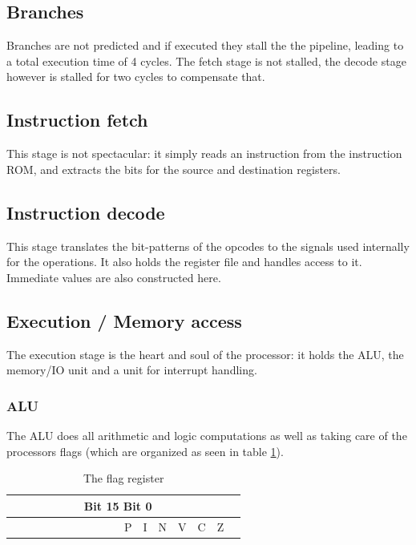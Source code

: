 \documentclass[10pt, twoside, a4paper]{article}
\begin{document}
  \subsection{Branches}
  Branches are not predicted and if executed they stall the the
  pipeline, leading to a total execution time of 4 cycles. The fetch
  stage is not stalled, the decode stage however is stalled for two
  cycles to compensate that.

  \subsection{Instruction fetch}
  This stage is not spectacular: it simply reads an instruction from
  the instruction ROM, and extracts the bits for the source and
  destination registers.

  \subsection{Instruction decode}
  This stage translates the bit-patterns of the opcodes to the signals
  used internally for the operations. It also holds the register file
  and handles access to it. Immediate values are also constructed here.

  \subsection{Execution / Memory access}
  The execution stage is the heart and soul of the processor: it holds
  the ALU, the memory/IO unit and a unit for interrupt handling.

  \subsubsection{ALU}
  The ALU does all arithmetic and logic computations as well as taking
  care of the processors flags (which are organized as seen in table
  \ref{tab:flags}).

  \begin{table}[ht!]
    \centering
    \begin{tabular}{|p{.75em}|p{.75em}|p{.75em}|p{.75em}
                    |p{.75em}|p{.75em}|p{.75em}|p{.75em}
		    |p{.75em}|p{.75em}|p{.75em}|p{.75em}
		    |p{.75em}|p{.75em}|p{.75em}|p{.75em}|p{.75em}}
      \multicolumn{16}{c}{Bit 15 \hfill Bit 0} \\
      \hline
      & & & & & & & & & & P & I & N & V & C & Z \\
      \hline
    \end{tabular}
    \caption{The flag register}
    \label{tab:flags}
  \end{table}
\end{document}
